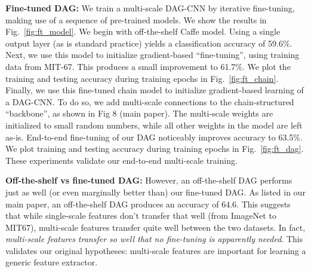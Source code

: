 \documentclass[10pt,twocolumn,letterpaper]{article}
\begin{document}
{\bf Fine-tuned DAG:} We train a multi-scale DAG-CNN by iterative fine-tuning, making use of a sequence of pre-trained models. We show the results in Fig.~\ref{fig:ft_model}. We begin with off-the-shelf Caffe model. Using a single output layer (as is standard practice) yields a classification accuracy of 59.6\%. Next, we use this model to initialize gradient-based ``fine-tuning'', using training data from MIT-67. This produces a small improvement to 61.7\%. We plot the training and testing accuracy during training epochs in Fig.~\ref{fig:ft_chain}. Finally, we use this fine-tuned chain model to initialize gradient-based learning of a DAG-CNN. To do so, we add multi-scale connections to the chain-structured ``backbone'', as shown in Fig 8 (main paper). The multi-scale weights are initialized to small random numbers, while all other weights in the model are left as-is. End-to-end fine-tuning of our DAG noticeably improves accuracy to 63.5\%. We plot training and testing accuracy during training epochs in Fig.~\ref{fig:ft_dag}. These experiments validate our end-to-end multi-scale training.



{\bf Off-the-shelf vs fine-tuned DAG:} However, an off-the-shelf DAG performs just as well (or even marginally better than) our fine-tuned DAG. As listed in our main paper, an off-the-shelf DAG produces an accuracy of 64.6. This suggests that while single-scale features don't transfer that well (from ImageNet to MIT67), multi-scale features transfer quite well between the two datasets. In fact, {\em multi-scale features transfer so well that no fine-tuning is apparently needed}. This validates our original hypotheses: multi-scale features are important for learning a generic feature extractor.%





\end{document}
